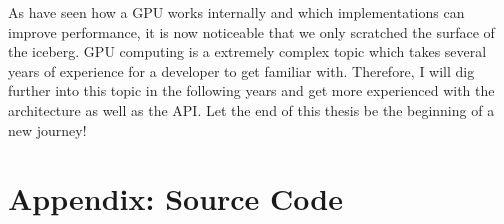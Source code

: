 \documentclass[draft, final]{vutinfth} %
\begin{document}
	As have seen how a GPU works internally and which implementations can improve performance, it is now noticeable that we only scratched the surface of the iceberg. GPU computing is a extremely complex topic which takes several years of experience for a developer to get familiar with. Therefore, I will dig further into this topic in the following years and get more experienced with the architecture as well as the API. Let the end of this thesis be the beginning of a new journey!

\chapter{Appendix: Source Code}
	
	
	
\backmatter

\listoffigures %

\cleardoublepage %
\listoftables %

\listofalgorithms
{}

\printindex

\printglossaries



\end{document}
